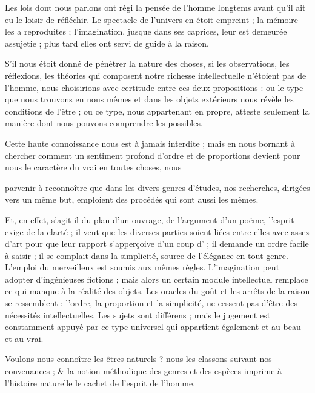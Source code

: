\documentclass[11pt,a4paper]{article}
\begin{document}

Les lois dont nous parlons ont régi la pensée de l'homme longtems avant qu'il
ait eu le loisir de réfléchir. Le spectacle de l'univers en étoit empreint ; la
mémoire les a reproduites ; l'imagination, jusque dans ses caprices, leur est
demeurée  assujetie ; plus tard elles ont servi de guide à la
raison.

S'il nous étoit donné de pénétrer la nature des choses, si les observations,
les réflexions, les théories qui composent notre richesse intellectuelle
n'étoient pas de l'homme, nous choisirions avec certitude entre ces deux
propositions : ou le type que nous trouvons en nous mêmes et dans les objets
extérieurs nous révèle les conditions de l'être ; ou ce type, nous appartenant
en propre, atteste seulement la manière dont nous pouvons comprendre les
possibles.

Cette haute connoissance nous est à jamais interdite ; mais en nous bornant à
chercher comment un sentiment profond d'ordre et de proportions devient pour
nous le caractère du vrai en toutes choses,  nous
 

\struck{\ill{}} parvenir à reconnoître  que dans les divers
genres d'études, nos recherches,  dirigées vers un même but,
emploient des procédés qui sont aussi les mêmes.

Et, en effet, s'agit-il du plan d'un ouvrage, de l'argument d'un poëme,
l'esprit exige de la clarté ; il veut que les diverses parties soient liées
entre elles avec assez d'art pour que leur rapport s'apperçoive d'un coup
d' ; il demande un ordre facile à saisir ; il se complait dans la
simplicité, source de l'élégance en tout genre. L'emploi du merveilleux est
soumis aux mêmes règles. L'imagination peut adopter d'ingénieuses fictions ;
mais alors un certain module intellectuel remplace ce qui manque à la réalité
des objets. Les oracles du goût et les arrêts de la raison se ressemblent :
l'ordre, la proportion et la simplicité,  ne cessent pas d'être des nécessités intellectuelles. Les
sujets sont différens ; mais le jugement est constamment appuyé par ce type
universel qui appartient également et au beau et au vrai.

Voulons-nous connoître les êtres naturels ? nous les classons suivant nos
convenances ; \& la notion méthodique des genres et des espèces imprime à
l'histoire naturelle le cachet de l'esprit de l'homme.
\end{document}
